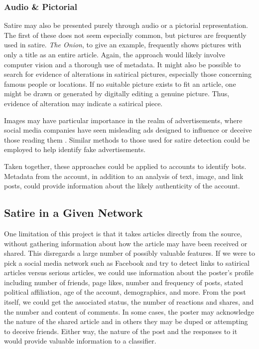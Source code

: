 \documentclass [12 pt] {report}
\begin{document}
\subsubsection*{Audio \& Pictorial}
Satire may also be presented purely through audio or a pictorial representation. The first of these does not seem especially common, but pictures are frequently used in satire. \textit{The Onion}, to give an example, frequently shows pictures with only a title as an entire article. Again, the approach would likely involve computer vision and a thorough use of metadata. It might also be possible to search for evidence of alterations in satirical pictures, especially those concerning famous people or locations. If no suitable picture exists to fit an article, one might be drawn or generated by digitally editing a genuine picture. Thus, evidence of alteration may indicate a satirical piece.

Images may have particular importance in the realm of advertisements, where social media companies have seen misleading ads designed to influence or deceive those reading them \cite{ads}. Similar methods to those used for satire detection could be employed to help identify fake advertisements.

Taken together, these approaches could be applied to accounts to identify bots. Metadata from the account, in addition to an analysis of text, image, and link posts, could provide information about the likely authenticity of the account.

\subsection{Satire in a Given Network}
One limitation of this project is that it takes articles directly from the source, without gathering information about how the article may have been received or shared. This disregards a large number of possibly valuable features. If we were to pick a social media network such as Facebook and try to detect links to satirical articles versus serious articles, we could use information about the poster's profile including number of friends, page likes, number and frequency of posts, stated political affiliation, age of the account, demographics, and more. From the post itself, we could get the associated status, the number of reactions and shares, and the number and content of comments. In some cases, the poster may acknowledge the nature of the shared article and in others they may be duped or attempting to deceive friends. Either way, the nature of the post and the responses to it would provide valuable information to a classifier.
\end{document}
